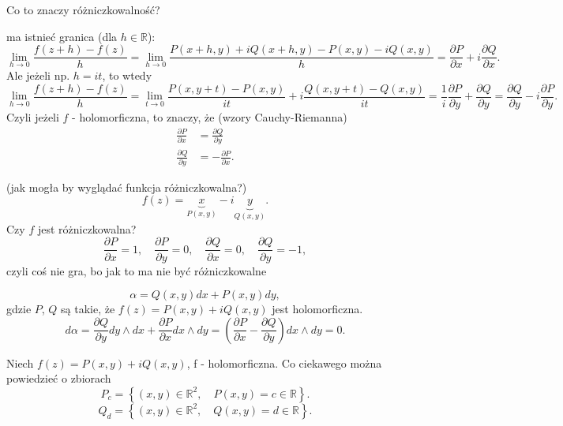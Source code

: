 \documentclass[../main.tex]{subfiles}
\begin{document}
\begin{pytanie}
    Co to znaczy różniczkowalność?
\end{pytanie}
ma istnieć granica (dla $h\in \mathbb{R}$):
\[
    \lim_{h \to 0} \frac{f(z+h) - f(z)}{h} = \lim_{h \to 0} \frac{P(x+h, y) + iQ(x + h, y) - P(x,y) - iQ(x,y)}{h} = \frac{\partial P}{\partial x} + i \frac{\partial Q}{\partial x}
.\]
Ale jeżeli np. $h = it$, to wtedy
 \[
     \lim_{h \to 0}\frac{f(z+h) - f(z)}{h} = \lim_{t \to 0}\frac{P(x, y+t) - P(x,y)}{it} + i \frac{Q(x, y+t) - Q(x,y)}{it} = \frac{1}{i} \frac{\partial P}{\partial y} + \frac{\partial Q}{\partial y} = \frac{\partial Q}{\partial y} - i \frac{\partial P}{\partial y}
.\]
Czyli jeżeli $f$ - holomorficzna, to znaczy, że (wzory Cauchy-Riemanna)
\begin{align*}
    \frac{\partial P}{\partial x} &= \frac{\partial Q}{\partial y}\\
    \frac{\partial Q}{\partial y} &= - \frac{\partial P}{\partial x}
.\end{align*}
\begin{przyklad}
    (jak mogła by wyglądać funkcja różniczkowalna?)
    \[
        f(z) = \underbrace{x}_{P(x,y)} - i\underbrace{y}_{Q(x,y)}
    .\]
Czy $f$ jest różniczkowalna?
\[
\frac{\partial P}{\partial x} = 1,\quad \frac{\partial P}{\partial y} = 0,\quad \frac{\partial Q}{\partial x}  = 0,\quad \frac{\partial Q}{\partial y} = -1
,\]
czyli coś nie gra, bo jak to ma nie być różniczkowalne
\end{przyklad}
\begin{przyklad}
    \[
        \alpha = Q(x,y)dx + P(x,y)dy
    ,\]
gdzie $P$, $Q$ są takie, że $f(z) = P(x,y) + iQ(x,y)$ jest holomorficzna.
\[
    d\alpha = \frac{\partial Q}{\partial y} dy\land dx + \frac{\partial P}{\partial x} dx\land dy = \left( \frac{\partial P}{\partial x} - \frac{\partial Q}{\partial y}  \right) dx\land dy = 0
.\]
\end{przyklad}
\begin{pytanie}
    Niech $f(z) = P(x,y) + iQ(x,y)$, f - holomorficzna. Co ciekawego można powiedzieć o zbiorach
    \[
        P_c = \left\{ (x,y)\in \mathbb{R}^2,\quad P(x,y) = c\in\mathbb{R} \right\}
    .\]
    \[
        Q_d = \left\{ (x,y)\in \mathbb{R}^2,\quad Q(x,y) = d\in \mathbb{R} \right\}
    .\]
\end{pytanie}
\end{document}
